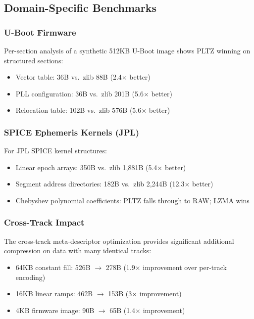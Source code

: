 \documentclass[11pt,a4paper]{article}
\begin{document}
\subsection{Domain-Specific Benchmarks}

\subsubsection{U-Boot Firmware}

Per-section analysis of a synthetic 512KB U-Boot image shows PLTZ winning on structured sections:
\begin{itemize}
\item Vector table: 36B vs.\ zlib 88B (2.4$\times$ better)
\item PLL configuration: 36B vs.\ zlib 201B (5.6$\times$ better)
\item Relocation table: 102B vs.\ zlib 576B (5.6$\times$ better)
\end{itemize}

\subsubsection{SPICE Ephemeris Kernels (JPL)}

For JPL SPICE kernel structures:
\begin{itemize}
\item Linear epoch arrays: 350B vs.\ zlib 1,881B (5.4$\times$ better)
\item Segment address directories: 182B vs.\ zlib 2,244B (12.3$\times$ better)
\item Chebyshev polynomial coefficients: PLTZ falls through to RAW; LZMA wins
\end{itemize}

\subsubsection{Cross-Track Impact}

The cross-track meta-descriptor optimization provides significant additional compression on data with many identical tracks:
\begin{itemize}
\item 64KB constant fill: 526B $\rightarrow$ 278B (1.9$\times$ improvement over per-track encoding)
\item 16KB linear ramps: 462B $\rightarrow$ 153B (3$\times$ improvement)
\item 4KB firmware image: 90B $\rightarrow$ 65B (1.4$\times$ improvement)
\end{itemize}
\end{document}
